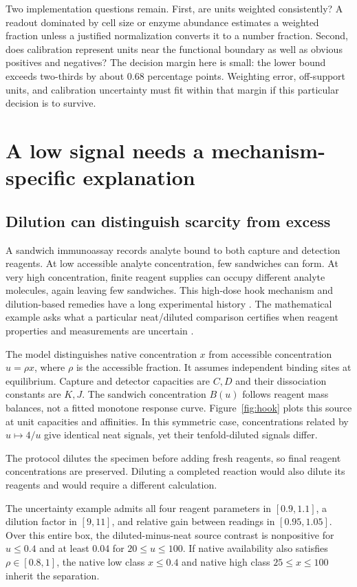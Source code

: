 \documentclass[11pt]{article}
\begin{document}
Two implementation questions remain. First, are units weighted consistently? A readout dominated by cell size or enzyme abundance estimates a weighted fraction unless a justified normalization converts it to a number fraction. Second, does calibration represent units near the functional boundary as well as obvious positives and negatives? The decision margin here is small: the lower bound exceeds two-thirds by about 0.68 percentage points. Weighting error, off-support units, and calibration uncertainty must fit within that margin if this particular decision is to survive.

\section{A low signal needs a mechanism-specific explanation}
\subsection{Dilution can distinguish scarcity from excess}
A sandwich immunoassay records analyte bound to both capture and detection reagents. At low accessible analyte concentration, few sandwiches can form. At very high concentration, finite reagent supplies can occupy different analyte molecules, again leaving few sandwiches. This high-dose hook mechanism and dilution-based remedies have a long experimental history \citep{fernando,ich}. The mathematical example asks what a particular neat/diluted comparison certifies when reagent properties and measurements are uncertain \citep{I}.

The model distinguishes native concentration $x$ from accessible concentration $u=\rho x$, where $\rho$ is the accessible fraction. It assumes independent binding sites at equilibrium. Capture and detector capacities are $C,D$ and their dissociation constants are $K,J$. The sandwich concentration $B(u)$ follows reagent mass balances, not a fitted monotone response curve. Figure~\ref{fig:hook} plots this source at unit capacities and affinities. In this symmetric case, concentrations related by $u\mapsto4/u$ give identical neat signals, yet their tenfold-diluted signals differ.

The protocol dilutes the specimen before adding fresh reagents, so final reagent concentrations are preserved. Diluting a completed reaction would also dilute its reagents and would require a different calculation.

The uncertainty example admits all four reagent parameters in $[0.9,1.1]$, a dilution factor in $[9,11]$, and relative gain between readings in $[0.95,1.05]$. Over this entire box, the diluted-minus-neat source contrast is nonpositive for $u\le0.4$ and at least 0.04 for $20\le u\le100$. If native availability also satisfies $\rho\in[0.8,1]$, the native low class $x\le0.4$ and native high class $25\le x\le100$ inherit the separation.
\end{document}
